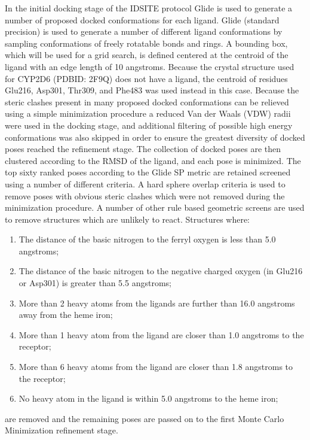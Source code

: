 In the initial docking stage of the IDSITE protocol Glide is used to generate a number of proposed docked conformations for each ligand.
Glide (standard precision) is used to generate a number of different ligand conformations by sampling conformations of freely rotatable bonds and rings.
A bounding box, which will be used for a grid search, is defined centered at the centroid of the ligand with an edge length of 10 angstroms.
Because the crystal structure used for CYP2D6 (PDBID: 2F9Q) does not have a ligand, the centroid of residues Glu216, Asp301, Thr309, and Phe483 was used instead in this case.
Because the steric clashes present in many proposed docked conformations can be relieved using a simple minimization procedure a reduced Van der Waals (VDW) radii were used in the docking stage, and additional filtering of possible high energy conformations was also skipped in order to ensure the greatest diversity of docked poses reached the refinement stage.
The collection of docked poses are then clustered according to the RMSD of the ligand, and each pose is minimized.
The top sixty ranked poses according to the Glide SP metric are retained screened using a number of different criteria.
A hard sphere overlap criteria is used to remove poses with obvious steric clashes which were not removed during the minimization procedure.
A number of other rule based geometric screens are used to remove structures which are unlikely to react.
Structures where:
\begin{enumerate}
\item The distance of the basic nitrogen to the ferryl oxygen is less than 5.0 angstroms;
\item The distance of the basic nitrogen to the negative charged oxygen (in Glu216 or Asp301) is greater than 5.5 angstroms;
\item More than 2 heavy atoms from the ligands are further than 16.0 angstroms away from the heme iron;
\item More than 1 heavy atom from the ligand are closer than 1.0 angstroms to the receptor;
\item More than 6 heavy atoms from the ligand are closer than 1.8 angstroms to the receptor;
\item No heavy atom in the ligand is within 5.0 angstroms to the heme iron;
\end{enumerate}
are removed and the remaining poses are passed on to the first Monte Carlo Minimization refinement stage.



